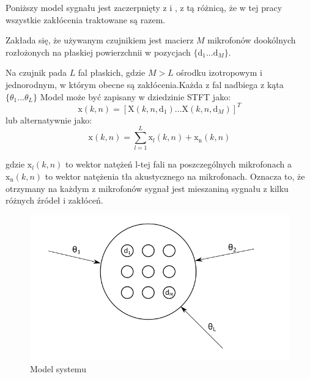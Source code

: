 \newpage 

\noindent Poniższy model sygnału jest zaczerpnięty z \cite{Thiergart2013} i \cite{Braun2014}, z tą różnicą, że w tej pracy wszystkie zakłócenia traktowane są razem.

\noindent Zakłada się, że używanym czujnikiem jest macierz $M$ mikrofonów dookólnych rozłożonych na płaskiej powierzchnii w pozycjach $\{\bm{\mathrm{d}}_1...\bm{\mathrm{d}}_M\}$.

\noindent Na czujnik pada $L$ fal płaskich, gdzie $M > L$ ośrodku izotropowym i jednorodnym, w którym obecne są zakłócenia.Każda z fal nadbiega z kąta $\{{\theta}_1...{\theta}_L\}$ Model może być zapisany w dziedzinie STFT jako:
\begin{equation}
    \label{equation:2.1}
    \bm{\mathrm{x}}(k,n)
    =
    [\mathrm{X}(k,n,\bm{\mathrm{d}}_{1})
    ...
    \mathrm{X}(k,n,\bm{\mathrm{d}}_{M})]^{T}
\end{equation}
lub alternatywnie jako:
\begin{equation}
    \label{equation:2.2}
    \bm{\mathrm{x}}(k,n)=
    \sum_{l=1}^{L} \bm{\mathrm{x}}_{l}(k,n)
    + \bm{\mathrm{x}}_{\mathrm{n}}(k,n)
\end{equation}

\noindent gdzie $\bm{\mathrm{x}}_l(k,n)$ to wektor natężeń l-tej fali na poszczególnych mikrofonach a $\bm{\mathrm{x}}_{\mathrm{n}}(k,n)$ to wektor natężenia tła akustycznego na mikrofonach.
Oznacza to, że otrzymany na każdym z mikrofonów sygnał jest mieszaniną sygnału z kilku różnych źródeł i zakłóceń.

\begin{figure}[h]
    \centering
    \includegraphics[width=\textwidth]{Images/model.png}
    \caption{Model systemu}
    \label{fig:model}
\end{figure}


